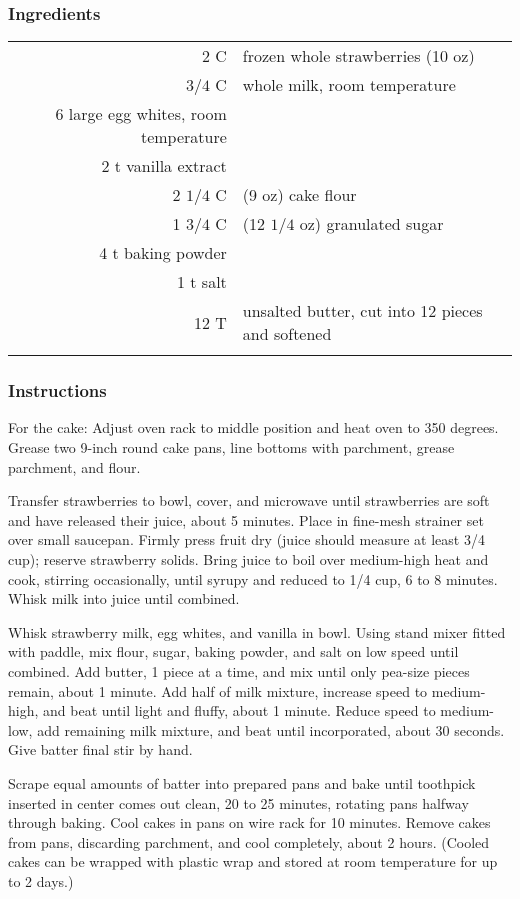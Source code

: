 \documentclass[12pt,landscape,twoside,twocolumn, openright, titlepage, draft]{book}
\begin{document}
\subsubsection{Ingredients}
\begin{tabular}{r p{1.5in}}
    2 C & frozen whole strawberries (10 oz) \\
    $3/4$ C & whole milk, room temperature \\
    6 large egg whites, room temperature \\
    2 t vanilla extract \\
    2 $1/4$ C & (9 oz) cake flour \\
    1 $3/4$ C & (12 $1/4$ oz) granulated sugar \\
    4 t baking powder \\
    1 t salt \\
    12 T & unsalted butter, cut into 12 pieces and softened \\ \\
\end{tabular}

\subsubsection{Instructions}

For the cake: Adjust oven rack to middle position and heat oven to 350 degrees. Grease two 9-inch round cake pans, line bottoms with parchment, grease parchment, and flour.

Transfer strawberries to bowl, cover, and microwave until strawberries are soft and have released their juice, about 5 minutes. Place in fine-mesh strainer set over small saucepan. Firmly press fruit dry (juice should measure at least 3/4 cup); reserve strawberry solids. Bring juice to boil over medium-high heat and cook, stirring occasionally, until syrupy and reduced to 1/4 cup, 6 to 8 minutes. Whisk milk into juice until combined.

Whisk strawberry milk, egg whites, and vanilla in bowl. Using stand
mixer fitted with paddle, mix flour, sugar, baking powder, and salt on
low speed until combined. Add butter, 1 piece at a time, and mix until
only pea-size pieces remain, about 1 minute. Add half of milk mixture,
increase speed to medium-high, and beat until light and fluffy, about
1 minute. Reduce speed to medium-low, add remaining milk mixture, and
beat until incorporated, about 30 seconds. Give batter final stir by
hand.

Scrape equal amounts of batter into prepared pans and bake until
toothpick inserted in center comes out clean, 20 to 25 minutes,
rotating pans halfway through baking. Cool cakes in pans on wire rack
for 10 minutes. Remove cakes from pans, discarding parchment, and cool
completely, about 2 hours. (Cooled cakes can be wrapped with plastic
wrap and stored at room temperature for up to 2 days.)
\end{document}
